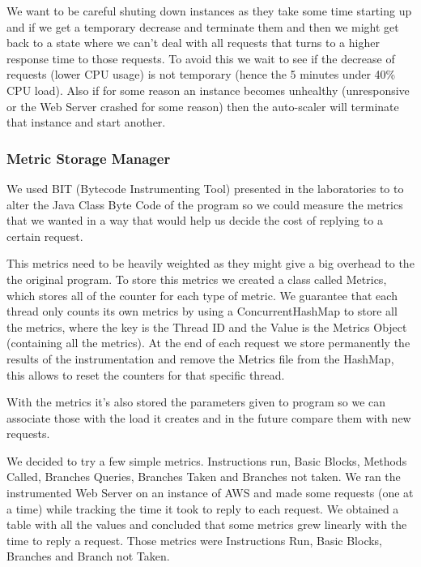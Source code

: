 \documentclass[times, 10pt,twocolumn]{article}
\begin{document}
   We want to be careful shuting down instances as they take some time starting up and if 
   we get a temporary decrease and terminate them and then we might get back to a state
   where we can't deal with all requests that turns to a higher response time to those 
   requests. To avoid this we wait to see if the decrease of requests (lower CPU usage)
   is not temporary (hence the 5 minutes under 40\% CPU load). Also if for some reason
   an instance becomes unhealthy (unresponsive or the Web Server crashed for some reason)
   then the auto-scaler will terminate that instance and start another.
\subsubsection{Metric Storage Manager}

   We used BIT (Bytecode Instrumenting Tool) presented in the laboratories to 
   to alter the Java Class Byte Code of the program so we could measure the metrics
   that we wanted in a way that would help us decide the cost of replying to a certain request.

   This metrics need to be heavily weighted as they might give a big overhead to the 
   the original program. To store this metrics we created a class called Metrics, which
   stores all of the counter for each type of metric. We guarantee that each thread only 
   counts its own metrics by using a ConcurrentHashMap to store all the metrics, where the 
   key is the Thread ID and the Value is the Metrics Object (containing all the metrics). At 
   the end of each request we store permanently the results of the instrumentation and remove
   the Metrics file from the HashMap, this allows to reset the counters for that specific thread.

   With the metrics it's also stored the parameters given to program so we can associate those with
   the load it creates and in the future compare them with new requests.


   We decided to try a few simple metrics. Instructions run, Basic Blocks, 
   Methods Called, Branches Queries, Branches Taken and Branches not taken. 
   We ran the instrumented Web Server on an instance of AWS and made some requests 
   (one at a time) while tracking the time it took to reply to each request.
   We obtained a table with all the values and concluded that some metrics grew
   linearly with the time to reply a request. Those metrics were Instructions
   Run, Basic Blocks, Branches and Branch not Taken.
\end{document}
